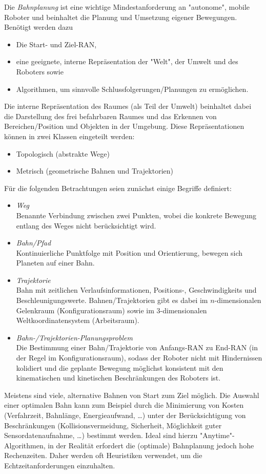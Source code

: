 	Die \emph{Bahnplanung} ist eine wichtige Mindestanforderung an "autonome", mobile Roboter und beinhaltet die Planung und Umsetzung eigener Bewegungen. Benötigt werden dazu
	\begin{itemize}
		\item Die Start- und Ziel-RAN,
		\item eine geeignete, interne Repräsentation der "Welt", \dh der Umwelt und des Roboters sowie
		\item Algorithmen, um sinnvolle Schlussfolgerungen/Planungen zu ermöglichen.
	\end{itemize}
	Die interne Repräsentation des Raumes (als Teil der Umwelt) beinhaltet dabei die Darstellung des frei befahrbaren Raumes und das Erkennen von Bereichen/Position und Objekten in der Umgebung. Diese Repräsentationen können in zwei Klassen eingeteilt werden:
	\begin{itemize}
		\item Topologisch (abstrakte Wege)
		\item Metrisch (geometrische Bahnen und Trajektorien)
	\end{itemize}
	Für die folgenden Betrachtungen seien zunächst einige Begriffe definiert:
	\begin{itemize}
		\item \emph{Weg} \\ Benannte Verbindung zwischen zwei Punkten, wobei die konkrete Bewegung entlang des Weges nicht berücksichtigt wird.
		\item \emph{Bahn/Pfad} \\ Kontinuierliche Punktfolge mit Position und Orientierung, \bspw bewegen sich Planeten auf einer Bahn.
		\item \emph{Trajektorie} \\ Bahn mit zeitlichen Verlaufsinformationen, \dh Positions-, Geschwindigkeits und \ggf Beschleunigungswerte. Bahnen/Trajektorien gibt es dabei im \(n\)-dimensionalen Gelenkraum (Konfigurationsraum) sowie im \num{3}-dimensionalen Weltkoordinatensystem (Arbeitsraum).
		\item \emph{Bahn-/Trajektorien-Planungsproblem} \\ Die Bestimmung einer Bahn/Trajektorie von Anfangs-RAN zu End-RAN (in der Regel im Konfigurationsraum), sodass der Roboter nicht mit Hindernissen kolidiert und die geplante Bewegung möglichst konsistent mit den kinematischen und kinetischen Beschränkungen des Roboters ist.
	\end{itemize}
	Meistens sind viele, alternative Bahnen von Start zum Ziel möglich. Die Auswahl einer optimalen Bahn kann zum Beispiel durch die Minimierung von Kosten (\zB Verfahrzeit, Bahnlänge, Energieaufwand, \dots) unter der Berücksichtigung von Beschränkungen (Kollisionsvermeidung, Sicherheit, Möglichkeit guter Sensordatenaufnahme, \dots) bestimmt werden. Ideal sind hierzu "Anytime"-Algorithmen, in der Realität erfordert die (optimale) Bahnplanung jedoch hohe Rechenzeiten. Daher werden oft Heuristiken verwendet, um die Echtzeitanforderungen einzuhalten.

